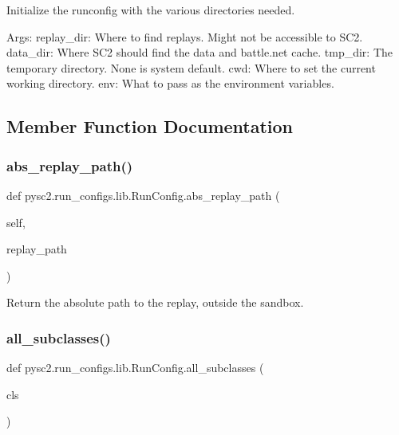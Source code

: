 \begin{DoxyVerb}Initialize the runconfig with the various directories needed.

Args:
  replay_dir: Where to find replays. Might not be accessible to SC2.
  data_dir: Where SC2 should find the data and battle.net cache.
  tmp_dir: The temporary directory. None is system default.
  cwd: Where to set the current working directory.
  env: What to pass as the environment variables.
\end{DoxyVerb}
 

\subsection{Member Function Documentation}
\mbox{\label{classpysc2_1_1run__configs_1_1lib_1_1_run_config_aaca5669c522ce76daf84075a40de9e3f}} 
\subsubsection{\texorpdfstring{abs\+\_\+replay\+\_\+path()}{abs\_replay\_path()}}
{\footnotesize\ttfamily def pysc2.\+run\+\_\+configs.\+lib.\+Run\+Config.\+abs\+\_\+replay\+\_\+path (\begin{DoxyParamCaption}\item[{}]{self,  }\item[{}]{replay\+\_\+path }\end{DoxyParamCaption})}

\begin{DoxyVerb}Return the absolute path to the replay, outside the sandbox.\end{DoxyVerb}
 \mbox{\label{classpysc2_1_1run__configs_1_1lib_1_1_run_config_a33621ff0a10545ef72e99fb96e4eb76c}} 
\subsubsection{\texorpdfstring{all\+\_\+subclasses()}{all\_subclasses()}}
{\footnotesize\ttfamily def pysc2.\+run\+\_\+configs.\+lib.\+Run\+Config.\+all\+\_\+subclasses (\begin{DoxyParamCaption}\item[{}]{cls }\end{DoxyParamCaption})}

